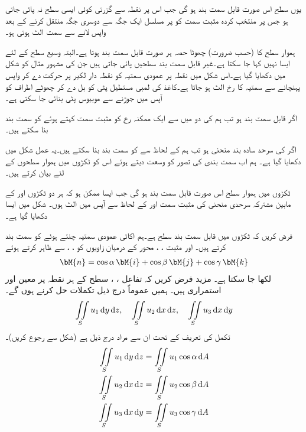 یوں سطح  اس صورت قابل سمت بند ہو گی جب اس پر نقطہ  سے گزرتی کوئی ایسی سطح  نہ پائی جاتی ہو جس پر منتخب کردہ مثبت سمت کو  پر مسلسل ایک جگہ سے دوسری جگہ منتقل کرنے کے بعد واپس  لانے سے سمت الٹ ہوتی ہو۔    

ہموار سطح کا (حسب ضرورت) چھوٹا حصہ ہر صورت قابل سمت بند ہوتا ہے۔البتہ وسیع سطح کے لئے ایسا نہیں کہا جا سکتا ہے۔غیر قابل سمت بند سطحیں پائی جاتی ہیں جن کی مشہور مثال  کو شکل میں دکھایا گیا ہے۔اس شکل میں نقطہ  پر عمودی سمتیہ کو نقطہ دار لکیر پر  حرکت دے کر  واپس  پہنچانے سے  سمتیہ کا رخ الٹ ہو جاتا ہے۔کاغذ کی لمبی مستطیل پٹی کو بل دے کر چھوٹے اطراف کو آپس میں جوڑنے سے موبیوس پٹی بنائی جا سکتی ہے۔

اگر  قابل سمت بند ہو تب ہم  کی دو میں سے ایک ممکنہ رخ کو مثبت سمت کہتے ہوئے  کو سمت بند بنا سکتے ہیں۔

اگر  کی سرحد  سادہ بند منحنی ہو تب ہم  کے لحاظ سے   کو سمت بند بنا سکتے ہیں۔یہ عمل شکل میں دکھایا گیا ہے۔ ہم اب سمت بندی کی تصور کو وسعت دیتے ہوئے اس کو ٹکڑوں میں ہموار سطحوں کے لئے بیان کرتے ہیں۔

ٹکڑوں میں ہموار سطح  اس صورت قابل سمت بند ہو گی جب ایسا ممکن ہو کہ ہر دو ٹکڑوں  اور  کے مابین مشترکہ سرحدی منحنی  کی مثبت سمت   اور  کے لحاظ سے آپس میں الٹ ہوں۔ شکل میں ایسا دکھایا گیا ہے۔

فرض کریں کہ   ٹکڑوں میں قابل سمت بند سطح ہے۔ہم اکائی عمودی سمتیہ  چنتے ہوئے  کو سمت بند کرتے ہیں۔  اور مثبت ، ،  محور  کے درمیان زاویوں کو ، ،  سے ظاہر کرتے ہوئے
\begin{align}\label{مساوات_خطی_تکمل_اکائی_عمودی_ارکان}
\bM{n}=\cos \alpha \,\bM{i}+\cos \beta \,\bM{j}+\cos \gamma \, \bM{k}
\end{align}
لکھا جا سکتا ہے۔ مزید فرض کریں کہ تفاعل ، ،  سطح   کے ہر نقطہ  پر  معین اور استمراری ہیں۔ ہمیں عموماً درج ذیل تکملات حل کرنے ہوں گے۔
\begin{align*}
\iint\limits_S u_1\dif y\dif z,\quad \iint\limits_S u_2\dif x\dif z,\quad \iint\limits_S u_3\dif x\dif y
\end{align*}
تکمل کی تعریف کے تحت ان سے مراد درج ذیل ہے (شکل  سے رجوع کریں)۔
\begin{gather}
\begin{aligned}\label{مساوات_خطی_تکمل_تین_قسم_کے_تکمل_الف}
\iint\limits_S u_1\dif y\dif z&=\iint\limits_S u_1\cos \alpha \dif A\\
\iint\limits_S u_2\dif x\dif z&=\iint\limits_S u_2\cos \beta \dif A\\
\iint\limits_S u_3\dif x\dif y&=\iint\limits_S u_3\cos \gamma \dif A
\end{aligned}
\end{gather}


